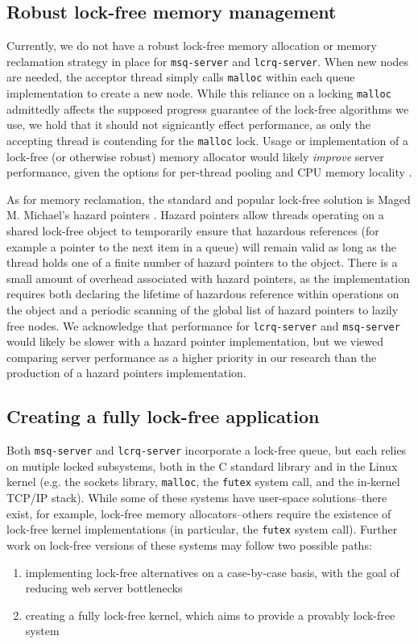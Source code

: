 \documentclass[twoside,10pt]{article}
\begin{document}
\begin{multicols}{2}
\subsection{Robust lock-free memory management}

Currently, we do not have a robust lock-free memory allocation or
memory reclamation strategy in place for \verb+msq-server+ and
\verb+lcrq-server+. When new nodes are needed, the acceptor thread
simply calls \verb+malloc+ within each queue implementation to create
a new node. While this reliance on a locking \verb+malloc+ admittedly
affects the supposed progress guarantee of the lock-free algorithms we
use, we hold that it should not signicantly effect performance, as
only the accepting thread is contending for the \verb+malloc+
lock. Usage or implementation of a lock-free (or otherwise robust)
memory allocator would likely \emph{improve} server performance, given the
options for per-thread pooling and CPU memory locality
\cite{hart2007performance}.

As for memory reclamation, the standard and popular lock-free solution
is Maged M. Michael's hazard pointers \cite{michael2004hazard}. Hazard
pointers allow threads operating on a shared lock-free object to
temporarily ensure that hazardous references (for example a pointer to
the next item in a queue) will remain valid as long as the thread
holds one of a finite number of hazard pointers to the object. There
is a small amount of overhead associated with hazard pointers, as the
implementation requires both declaring the lifetime of hazardous
reference within operations on the object and a periodic scanning of
the global list of hazard pointers to lazily free nodes. We
acknowledge that performance for \verb+lcrq-server+ and
\verb+msq-server+ would likely be slower with a hazard pointer
implementation, but we viewed comparing server performance as a higher
priority in our research than the production of a hazard pointers
implementation.

\subsection{Creating a fully lock-free application}

Both \verb+msq-server+ and \verb+lcrq-server+ incorporate a lock-free
queue, but each relies on mutiple locked subsystems, both in the C
standard library and in the Linux kernel (e.g. the sockets library,
\verb+malloc+, the \verb+futex+ system call, and the in-kernel TCP/IP
stack). While some of these systems have user-space solutions\---there
exist, for example, lock-free memory allocators\---others require the
existence of lock-free kernel implementations (in particular, the
\verb+futex+ system call). Further work on lock-free versions of these
systems may follow two possible paths:
\begin{enumerate}
\item implementing lock-free alternatives on a case-by-case basis,
  with the goal of reducing web server bottlenecks 
\item creating a fully lock-free kernel, which aims to provide a
  provably lock-free system
\end{enumerate}


\end{multicols}
\end{document}
